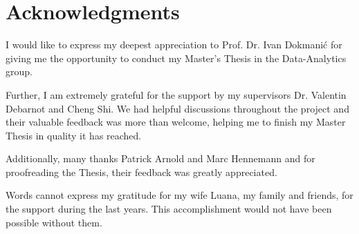 \chapter{Acknowledgments}

I would like to express my deepest appreciation to Prof. Dr. Ivan Dokmanić
for giving me the opportunity to conduct my Master's Thesis in the 
Data-Analytics group.

\bigskip

Further, I am extremely grateful for the support by my supervisors
Dr. Valentin Debarnot and Cheng Shi. We had helpful discussions
throughout the project and their valuable feedback was more than welcome,
helping me to finish my Master Thesis in quality it has reached.

\bigskip
Additionally, many thanks Patrick Arnold and Marc Hennemann and for 
proofreading the Thesis, their feedback was greatly appreciated.

\bigskip
Words cannot express my gratitude for my wife Luana, my family and friends,
for the support during the last years.
This accomplishment would not have been possible without them.